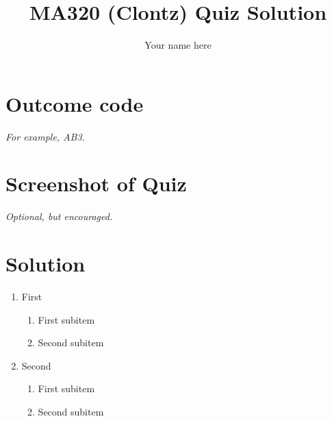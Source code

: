 \documentclass{article}
\title{MA320 (Clontz) Quiz Solution}
\author{Your name here}
\begin{document}
\maketitle

\section{Outcome code}
\textit{For example, AB3.}





\section{Screenshot of Quiz}
\textit{Optional, but encouraged.}





\section{Solution}

\begin{enumerate}
\item First 
  \begin{enumerate}
    \item First subitem
    \item Second subitem
  \end{enumerate}
\item Second
  \begin{enumerate}
    \item First subitem
    \item Second subitem
  \end{enumerate}
\end{enumerate}
\end{document}
